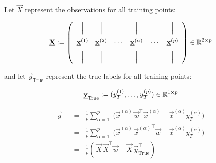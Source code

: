\begin{frame}

Let $\vec X$ represent the observations for all training points:

\begin{equation}
\underline{\mathbf{X}} := 
\left(
\begin{array}{cccccc}
\Big| & \Big| & & \Big| & & \Big| \\[3mm]
\underline{\mathbf{x}}^{(1)} & \underline{\mathbf{x}}^{(2)} & \cdots & \underline{\mathbf{x}}^{(\alpha)} & \cdots & \underline{\mathbf{x}}^{(p)}\\[2mm]
\Big| & \Big| & & \Big| & & \Big|
\end{array}
\right) \in \mathbb{R}^{2 \times p}
\end{equation}

and let $\vec y_{\text{True}}$ represent the true labels for all training points:

\begin{equation}
\underline{\mathbf{y}}_{\text{True}} := (y_T^{(1)}, \ldots, y_T^{(p)}) \in \mathbb{R}^{1 \times p}
\end{equation}


\begin{align}
\vec g
\;\;&=\;\;
\frac{1}{p} \sum_{\alpha=1}^{p} \;
\big( \vec x^{(\alpha)} \, \vec w^{\top}\vec x^{(\alpha)} - \vec x^{(\alpha)} y_{T}^{(\alpha)} \big)\\
\;\;&=\;\;
\frac{1}{p} \sum_{\alpha=1}^{p} \;
\big( \vec x^{(\alpha)} \, {\vec x^{(\alpha)}}^{\top} \vec w- \vec x^{(\alpha)} y_{T}^{(\alpha)} \big)\\
\;\;&=\;\;
\frac{1}{p} \left(\, \vec X \, \vec X^\top \vec w - \vec X\, \vec y_{\text{True}}^\top \right)
\end{align}

\end{frame}

